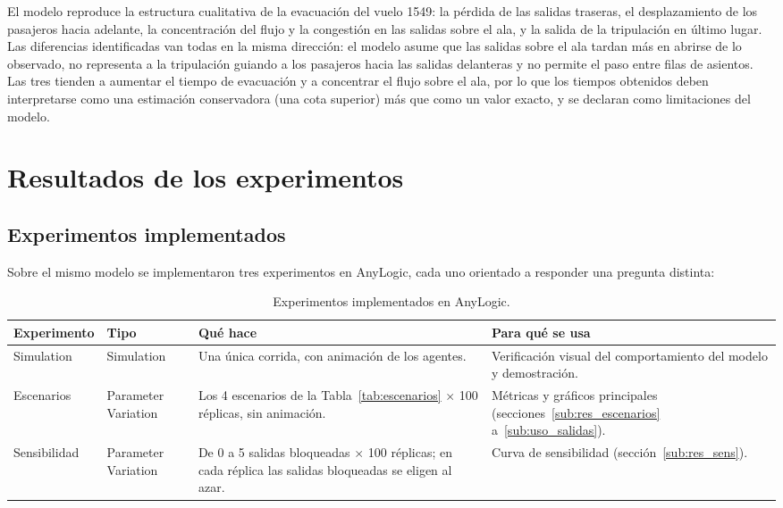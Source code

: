 \documentclass[a4paper, 11pt]{article}
\newif\ifmostraravisos
\newcommand{\pendiente}{%
  \ifmostraravisos
    \par\medskip\noindent
    \colorbox{yellow}{\parbox{\dimexpr\linewidth-2\fboxsep\relax}{\small\textbf{[ESTOS DATOS SON ANTES DE TERMINAR EL PROYECTO, UNA VEZ TERMINADO VOLVER A ESCRIBIR ESTA CONCLUSIÓN/FOTO]}}}%
    \par\medskip
  \fi}
\begin{document}
\pendiente

El modelo reproduce la estructura cualitativa de la evacuaci\'on del vuelo 1549: la
p\'erdida de las salidas traseras, el desplazamiento de los pasajeros hacia
adelante, la concentraci\'on del flujo y la congesti\'on en las salidas sobre el ala,
y la salida de la tripulaci\'on en \'ultimo lugar. Las diferencias identificadas van
todas en la misma direcci\'on: el modelo asume que las salidas sobre el ala tardan
m\'as en abrirse de lo observado, no representa a la tripulaci\'on guiando a los
pasajeros hacia las salidas delanteras y no permite el paso entre filas de asientos.
Las tres tienden a aumentar el tiempo de evacuaci\'on y a concentrar el flujo sobre
el ala, por lo que los tiempos obtenidos deben interpretarse como una estimaci\'on
conservadora (una cota superior) m\'as que como un valor exacto, y se declaran como
limitaciones del modelo.

\newpage
\section{Resultados de los experimentos}\label{sec:resultados}

\subsection{Experimentos implementados}

Sobre el mismo modelo se implementaron tres experimentos en AnyLogic, cada uno
orientado a responder una pregunta distinta:

\begin{table}[H]
\centering
\small
\begin{tabular}{L{2.2cm}L{2.3cm}L{4.8cm}L{4.4cm}}
\toprule
\textbf{Experimento} & \textbf{Tipo} & \textbf{Qu\'e hace} & \textbf{Para qu\'e se usa} \\
\midrule
Simulation & Simulation & Una \'unica corrida, con animaci\'on de los agentes. & Verificaci\'on visual del comportamiento del modelo y demostraci\'on. \\
\midrule
Escenarios & Parameter Variation & Los 4 escenarios de la Tabla~\ref{tab:escenarios} $\times$ 100 r\'eplicas, sin animaci\'on. & M\'etricas y gr\'aficos principales (secciones~\ref{sub:res_escenarios} a~\ref{sub:uso_salidas}). \\
\midrule
Sensibilidad & Parameter Variation & De 0 a 5 salidas bloqueadas $\times$ 100 r\'eplicas; en cada r\'eplica las salidas bloqueadas se eligen al azar. & Curva de sensibilidad (secci\'on~\ref{sub:res_sens}). \\
\bottomrule
\end{tabular}
\caption{Experimentos implementados en AnyLogic.}
\label{tab:experimentos}
\end{table}
\end{document}

